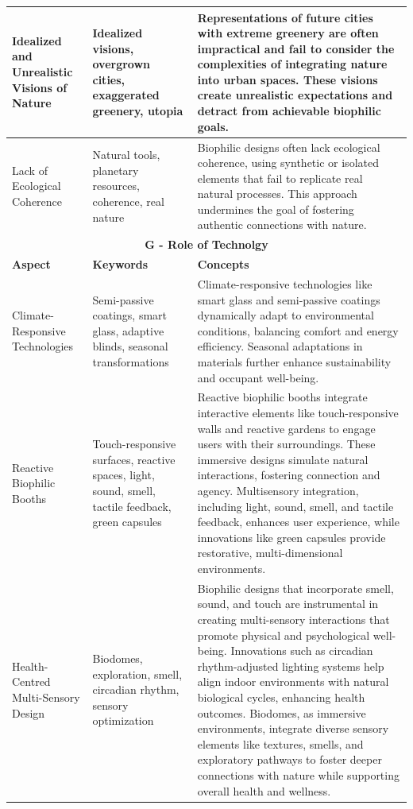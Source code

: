 \begin{longtable}{|p{3cm}|p{3.5cm}|p{7.5cm}|}
Idealized and Unrealistic Visions of Nature & Idealized visions, overgrown cities, exaggerated greenery, utopia & Representations of future cities with extreme greenery are often impractical and fail to consider the complexities of integrating nature into urban spaces. These visions create unrealistic expectations and detract from achievable biophilic goals. \\
\hline

Lack of Ecological Coherence & Natural tools, planetary resources, coherence, real nature & Biophilic designs often lack ecological coherence, using synthetic or isolated elements that fail to replicate real natural processes. This approach undermines the goal of fostering authentic connections with nature. \\
\hline

\multicolumn{3}{|c|}{\cellcolor[HTML]{E3F2FD}\textbf{G - Role of Technolgy}} \\ \hline
\textbf{Aspect} & \textbf{Keywords} & \textbf{Concepts} \\
\hline

Climate-Responsive Technologies & Semi-passive coatings, smart glass, adaptive blinds, seasonal transformations & Climate-responsive technologies like smart glass and semi-passive coatings dynamically adapt to environmental conditions, balancing comfort and energy efficiency. Seasonal adaptations in materials further enhance sustainability and occupant well-being. \\ \hline

Reactive Biophilic Booths & Touch-responsive surfaces, reactive spaces, light, sound, smell, tactile feedback, green capsules & Reactive biophilic booths integrate interactive elements like touch-responsive walls and reactive gardens to engage users with their surroundings. These immersive designs simulate natural interactions, fostering connection and agency. Multisensory integration, including light, sound, smell, and tactile feedback, enhances user experience, while innovations like green capsules provide restorative, multi-dimensional environments. \\ \hline

Health-Centred Multi-Sensory Design & Biodomes, exploration, smell, circadian rhythm, sensory optimization & Biophilic designs that incorporate smell, sound, and touch are instrumental in creating multi-sensory interactions that promote physical and psychological well-being. Innovations such as circadian rhythm-adjusted lighting systems help align indoor environments with natural biological cycles, enhancing health outcomes. Biodomes, as immersive environments, integrate diverse sensory elements like textures, smells, and exploratory pathways to foster deeper connections with nature while supporting overall health and wellness. \\
\hline


\end{longtable}
